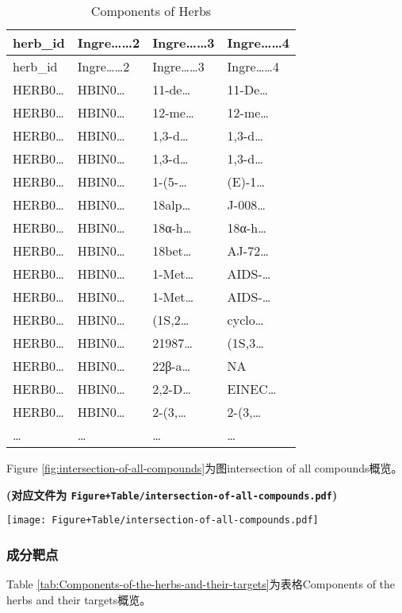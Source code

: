 \documentclass[
]{article}
\begin{document}
\begin{longtable}[]{@{}llll@{}}
\caption{\label{tab:Components-of-Herbs}Components of Herbs}\tabularnewline
\toprule
herb\_id & Ingre\ldots\ldots2 & Ingre\ldots\ldots3 & Ingre\ldots\ldots4\tabularnewline
\midrule
\endfirsthead
\toprule
herb\_id & Ingre\ldots\ldots2 & Ingre\ldots\ldots3 & Ingre\ldots\ldots4\tabularnewline
\midrule
\endhead
HERB0\ldots{} & HBIN0\ldots{} & 11-de\ldots{} & 11-De\ldots{}\tabularnewline
HERB0\ldots{} & HBIN0\ldots{} & 12-me\ldots{} & 12-me\ldots{}\tabularnewline
HERB0\ldots{} & HBIN0\ldots{} & 1,3-d\ldots{} & 1,3-d\ldots{}\tabularnewline
HERB0\ldots{} & HBIN0\ldots{} & 1,3-d\ldots{} & 1,3-d\ldots{}\tabularnewline
HERB0\ldots{} & HBIN0\ldots{} & 1-(5-\ldots{} & (E)-1\ldots{}\tabularnewline
HERB0\ldots{} & HBIN0\ldots{} & 18alp\ldots{} & J-008\ldots{}\tabularnewline
HERB0\ldots{} & HBIN0\ldots{} & 18α-h\ldots{} & 18α-h\ldots{}\tabularnewline
HERB0\ldots{} & HBIN0\ldots{} & 18bet\ldots{} & AJ-72\ldots{}\tabularnewline
HERB0\ldots{} & HBIN0\ldots{} & 1-Met\ldots{} & AIDS-\ldots{}\tabularnewline
HERB0\ldots{} & HBIN0\ldots{} & 1-Met\ldots{} & AIDS-\ldots{}\tabularnewline
HERB0\ldots{} & HBIN0\ldots{} & (1S,2\ldots{} & cyclo\ldots{}\tabularnewline
HERB0\ldots{} & HBIN0\ldots{} & 21987\ldots{} & (1S,3\ldots{}\tabularnewline
HERB0\ldots{} & HBIN0\ldots{} & 22β-a\ldots{} & NA\tabularnewline
HERB0\ldots{} & HBIN0\ldots{} & 2,2-D\ldots{} & EINEC\ldots{}\tabularnewline
HERB0\ldots{} & HBIN0\ldots{} & 2-(3,\ldots{} & 2-(3,\ldots{}\tabularnewline
\ldots{} & \ldots{} & \ldots{} & \ldots{}\tabularnewline
\bottomrule
\end{longtable}

Figure \ref{fig:intersection-of-all-compounds}为图intersection of all compounds概览。

\textbf{(对应文件为 \texttt{Figure+Table/intersection-of-all-compounds.pdf})}

\def\@captype{figure}
\begin{center}
\texttt{[image: Figure+Table/intersection-of-all-compounds.pdf]}
\caption{Intersection of all compounds}\label{fig:intersection-of-all-compounds}
\end{center}

\hypertarget{ux6210ux5206ux9776ux70b9}{%
\subsubsection{成分靶点}\label{ux6210ux5206ux9776ux70b9}}

Table \ref{tab:Components-of-the-herbs-and-their-targets}为表格Components of the herbs and their targets概览。
\end{document}
